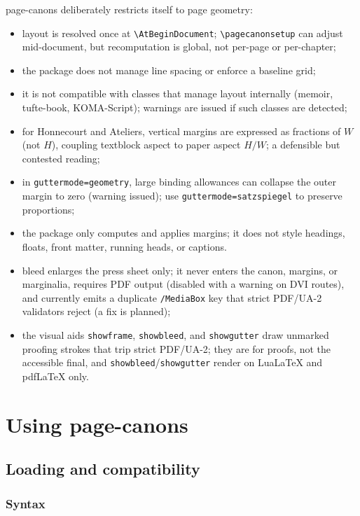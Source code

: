 \documentclass[11pt, twoside, openany]{book}
\newcommand{\pkg}[1]{\textsf{#1}}
\newcommand{\cmd}[1]{\texttt{\textbackslash #1}}
\begin{document}
\pkg{page-canons} deliberately restricts itself to page geometry:
\begin{itemize}
	\item layout is resolved once at \cmd{AtBeginDocument}; \cmd{pagecanonsetup} can adjust mid-document, but recomputation is global, not per-page or per-chapter;
	\item the package does not manage line spacing or enforce a baseline grid;
	\item it is not compatible with classes that manage layout internally (\pkg{memoir}, \pkg{tufte-book}, KOMA-Script); warnings are issued if such classes are detected;
	\item for Honnecourt and Ateliers, vertical margins are expressed as fractions of $W$ (not $H$), coupling textblock aspect to paper aspect $H/W$; a defensible but contested reading;
	\item in \texttt{guttermode=geometry}, large binding allowances can collapse the outer margin to zero (warning issued); use \texttt{guttermode=satzspiegel} to preserve proportions;
	\item the package only computes and applies margins; it does not style headings, floats, front matter, running heads, or captions.
	\item bleed enlarges the press sheet only; it never enters the canon, margins, or marginalia, requires PDF output (disabled with a warning on DVI routes), and currently emits a duplicate \texttt{/MediaBox} key that strict PDF/UA-2 validators reject (a fix is planned);
    \item the visual aids \texttt{showframe}, \texttt{showbleed}, and \texttt{showgutter} draw unmarked proofing strokes that trip strict PDF/UA-2; they are for proofs, not the accessible final, and \texttt{showbleed}/\texttt{showgutter} render on Lua\LaTeX{} and pdf\LaTeX{} only.

\end{itemize}


\part{Using page-canons}\label{part:using}


\chapter{Loading and compatibility}\label{chapter:loading}

\section{Syntax}\label{sec:syntax}
\end{document}
